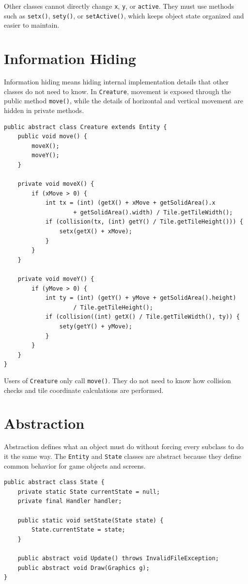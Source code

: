 \documentclass[12pt,a4paper]{article}
\begin{document}
Other classes cannot directly change \texttt{x}, \texttt{y}, or \texttt{active}. They must use methods such as \texttt{setx()}, \texttt{sety()}, or \texttt{setActive()}, which keeps object state organized and easier to maintain.

\section{Information Hiding}

Information hiding means hiding internal implementation details that other classes do not need to know. In \texttt{Creature}, movement is exposed through the public method \texttt{move()}, while the details of horizontal and vertical movement are hidden in private methods.

\begin{lstlisting}
public abstract class Creature extends Entity {
    public void move() {
        moveX();
        moveY();
    }

    private void moveX() {
        if (xMove > 0) {
            int tx = (int) (getX() + xMove + getSolidArea().x
                    + getSolidArea().width) / Tile.getTileWidth();
            if (collision(tx, (int) getY() / Tile.getTileHeight())) {
                setx(getX() + xMove);
            }
        }
    }

    private void moveY() {
        if (yMove > 0) {
            int ty = (int) (getY() + yMove + getSolidArea().height)
                    / Tile.getTileHeight();
            if (collision((int) getX() / Tile.getTileWidth(), ty)) {
                sety(getY() + yMove);
            }
        }
    }
}
\end{lstlisting}

Users of \texttt{Creature} only call \texttt{move()}. They do not need to know how collision checks and tile coordinate calculations are performed.

\section{Abstraction}

Abstraction defines what an object must do without forcing every subclass to do it the same way. The \texttt{Entity} and \texttt{State} classes are abstract because they define common behavior for game objects and screens.

\begin{lstlisting}
public abstract class State {
    private static State currentState = null;
    private final Handler handler;

    public static void setState(State state) {
        State.currentState = state;
    }

    public abstract void Update() throws InvalidFileException;
    public abstract void Draw(Graphics g);
}
\end{lstlisting}
\end{document}
